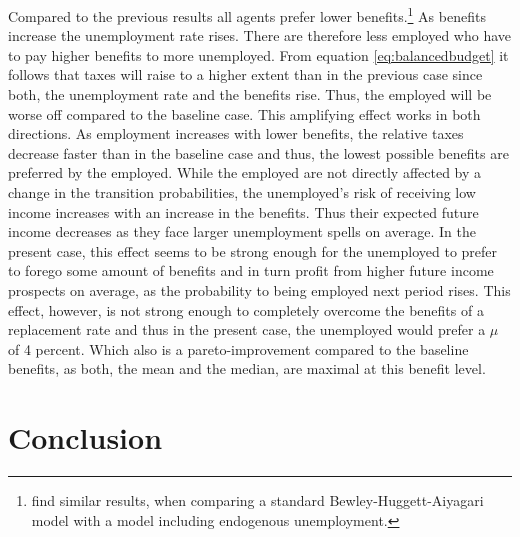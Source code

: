 \documentclass[a4paper,12pt]{article}
\begin{document}
Compared to the previous results all agents prefer lower benefits.\footnote{\cite{KrusellMukoyamaSahin} find similar results, when comparing a standard Bewley-Huggett-Aiyagari model with a model including endogenous unemployment.} 
As benefits increase the unemployment rate rises. There are therefore less employed who have to pay higher benefits to more unemployed. From equation \eqref{eq:balancedbudget} it follows that taxes will raise to a higher extent than in the previous case since both, the unemployment rate and the benefits rise. Thus, the employed will be worse off compared to the baseline case. This amplifying effect works in both directions. As employment increases with lower benefits, the relative taxes decrease faster than in the baseline case and thus, the lowest possible benefits are preferred by the employed. 
While the employed are not directly affected by a change in the transition probabilities, the unemployed's risk of receiving low income increases with an increase in the benefits. Thus their expected future income decreases as they face larger unemployment spells on average. In the present case, this effect seems to be strong enough for the unemployed to prefer to forego some amount of benefits and in turn profit from higher future income prospects on average, as the probability to being employed next period rises. This effect, however, is not strong enough to completely overcome the benefits of a replacement rate and thus in the present case, the unemployed would prefer a $\mu$ of 4 percent. Which also is a pareto-improvement compared to the baseline benefits, as both, the mean and the median, are maximal at this benefit level. 


\section{Conclusion}
\end{document}
